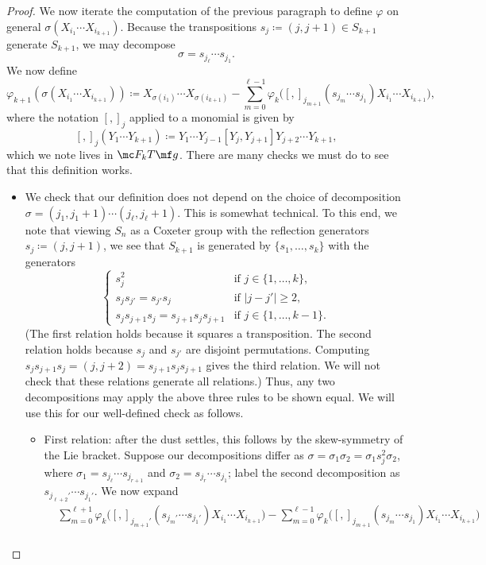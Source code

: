 \documentclass[../notes.tex]{subfiles}
\begin{document}
\begin{proof}
	We now iterate the computation of the previous paragraph to define $\varphi$ on general $\sigma(X_{i_1}\cdots X_{i_{k+1}})$. Because the transpositions $s_j\coloneqq(j,j+1)\in S_{k+1}$ generate $S_{k+1}$, we may decompose
	\[\sigma=s_{j_\ell}\cdots s_{j_1}.\]
	We now define
	\[\varphi_{k+1}\left(\sigma(X_{i_1}\cdots X_{i_{k+1}})\right)\coloneqq X_{\sigma(i_1)}\cdots X_{\sigma(i_{k+1})}-\sum_{m=0}^{\ell-1}\varphi_k\big([,]_{j_{m+1}}(s_{j_m}\cdots s_{j_1})X_{i_1}\cdots X_{i_{k+1}}\big),\]
	where the notation $[,]_j$ applied to a monomial is given by
	\[[,]_j(Y_1\cdots Y_{k+1})\coloneqq Y_1\cdots Y_{j-1}[Y_j,Y_{j+1}]Y_{j+2}\cdots Y_{k+1},\]
	which we note lives in $\mc F_kT\mf g$. There are many checks we must do to see that this definition works.
	\begin{itemize}
		\item We check that our definition does not depend on the choice of decomposition $\sigma=(j_1,j_1+1)\cdots(j_\ell,j_\ell+1)$. This is somewhat technical. To this end, we note that viewing $S_n$ as a Coxeter group with the reflection generators $s_j\coloneqq(j,j+1)$, we see that $S_{k+1}$ is generated by $\{s_1,\ldots,s_k\}$ with the generators
		\[\begin{cases}
			s_j^2 & \text{if }j\in\{1,\ldots,k\}, \\
			s_js_{j'}=s_{j'}s_j & \text{if }\left|j-j'\right|\ge2, \\
			s_js_{j+1}s_j=s_{j+1}s_js_{j+1} & \text{if }j\in\{1,\ldots,k-1\}.
		\end{cases}\]
		(The first relation holds because it squares a transposition. The second relation holds because $s_j$ and $s_{j'}$ are disjoint permutations. Computing $s_js_{j+1}s_j=(j,j+2)=s_{j+1}s_js_{j+1}$ gives the third relation. We will not check that these relations generate all relations.) Thus, any two decompositions may apply the above three rules to be shown equal. We will use this for our well-defined check as follows.
		\begin{itemize}
			\item First relation: after the dust settles, this follows by the skew-symmetry of the Lie bracket. Suppose our decompositions differ as $\sigma=\sigma_1\sigma_2=\sigma_1s_j^2\sigma_2$, where $\sigma_1=s_{j_\ell}\cdots s_{j_{r+1}}$ and $\sigma_2=s_{j_{r}}\cdots s_{j_1}$; label the second decomposition as $s_{j_{\ell+2}'}\cdots s_{j_1'}$. We now expand
			\begin{align*}
				& \sum_{m=0}^{\ell+1}\varphi_k\big([,]_{j_{m+1}'}(s_{j_m'}\cdots s_{j_1'})X_{i_1}\cdots X_{i_{k+1}}\big)-\sum_{m=0}^{\ell-1}\varphi_k\big([,]_{j_{m+1}}(s_{j_m}\cdots s_{j_1})X_{i_1}\cdots X_{i_{k+1}}\big) \\

\end{align*}
\end{itemize}
\end{itemize}
\end{proof}
\end{document}
